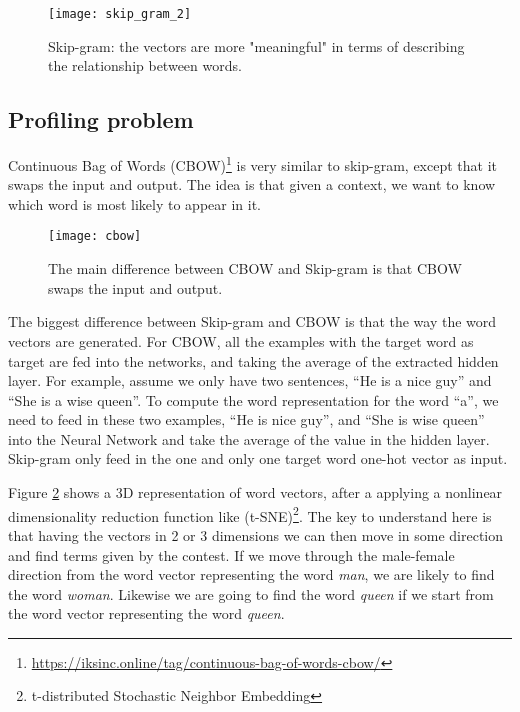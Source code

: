 \begin{figure}[ht]
	\centering
	\texttt{[image: skip\_gram\_2]}
	\caption[Skip-gram relationship between words]{Skip-gram: the vectors are more "meaningful" in terms of describing the relationship between words.}
	\label{fig:skip_gram_2}
\end{figure}

\subsection{Profiling problem}

Continuous Bag of Words (CBOW)\footnote{\url{https://iksinc.online/tag/continuous-bag-of-words-cbow/}} is very similar to skip-gram, except that it swaps the input and output. The idea is that given a context, we want to know which word is most likely to appear in it.

\begin{figure}[ht]
	\centering
	\texttt{[image: cbow]}
	\caption[CBOW and Skip-gram]{The main difference between CBOW and Skip-gram is that CBOW swaps the input and output.}
	\label{fig:cbow}
\end{figure}


The biggest difference between Skip-gram and CBOW is that the way the word vectors are generated. For CBOW, all the examples with the target word as target are fed into the networks, and taking the average of the extracted hidden layer. For example, assume we only have two sentences, “He is a nice guy” and “She is a wise queen”. To compute the word representation for the word “a”, we need to feed in these two examples, “He is nice guy”, and “She is wise queen” into the Neural Network and take the average of the value in the hidden layer. Skip-gram only feed in the one and only one target word one-hot vector as input.

Figure \ref{fig:cbow} shows a 3D representation of word vectors, after a applying a nonlinear dimensionality reduction function like (t-SNE)\footnote{t-distributed Stochastic Neighbor Embedding}\cite{maaten2008visualizing}. The key to understand here is that having the vectors in 2 or 3 dimensions we can then move in some direction and find terms given by the contest. If we move through the male-female direction from the word vector representing the word \textit{man}, we are likely to find the word \textit{woman}. Likewise we are going to find the word \textit{queen} if we start from the word vector representing the word \textit{queen}.


